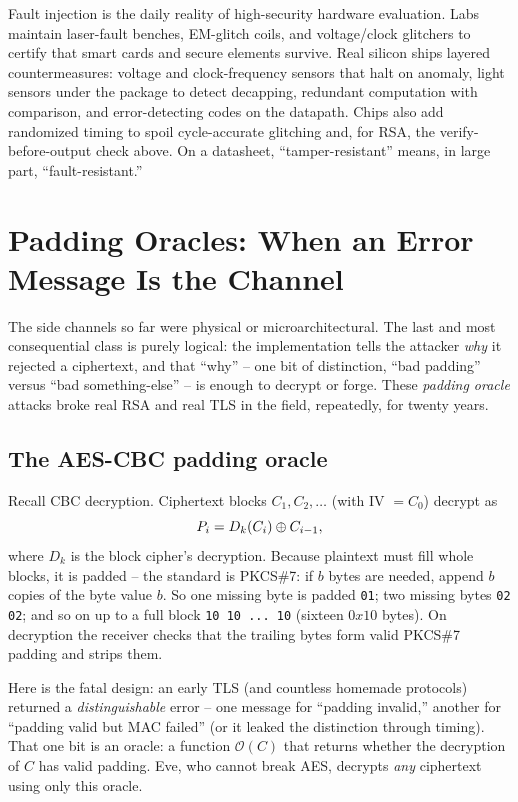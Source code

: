 \begin{applicationbox}
Fault injection is the daily reality of high-security hardware evaluation. Labs maintain laser-fault benches, EM-glitch coils, and voltage/clock glitchers to certify that smart cards and secure elements survive. Real silicon ships layered countermeasures: voltage and clock-frequency sensors that halt on anomaly, light sensors under the package to detect decapping, redundant computation with comparison, and error-detecting codes on the datapath. Chips also add randomized timing to spoil cycle-accurate glitching and, for RSA, the verify-before-output check above. On a datasheet, ``tamper-resistant'' means, in large part, ``fault-resistant.''
\end{applicationbox}

\section{Padding Oracles: When an Error Message Is the Channel}
\label{ch37:padding}

The side channels so far were physical or microarchitectural. The last and most consequential class is purely logical: the implementation tells the attacker \emph{why} it rejected a ciphertext, and that ``why'' -- one bit of distinction, ``bad padding'' versus ``bad something-else'' -- is enough to decrypt or forge. These \emph{padding oracle} attacks broke real RSA and real TLS in the field, repeatedly, for twenty years.

\subsection{The AES-CBC padding oracle}
\label{ch37:cbc-oracle}

Recall CBC decryption. Ciphertext blocks $C_1, C_2, \ldots$ (with IV $= C_0$) decrypt as
\[
P_i = D_k(C_i) \oplus C_{i-1},
\]
where $D_k$ is the block cipher's decryption. Because plaintext must fill whole blocks, it is padded -- the standard is PKCS\#7: if $b$ bytes are needed, append $b$ copies of the byte value $b$. So one missing byte is padded \texttt{01}; two missing bytes \texttt{02 02}; and so on up to a full block \texttt{10 10 ... 10} (sixteen $0x10$ bytes). On decryption the receiver checks that the trailing bytes form valid PKCS\#7 padding and strips them.

Here is the fatal design: an early TLS (and countless homemade protocols) returned a \emph{distinguishable} error -- one message for ``padding invalid,'' another for ``padding valid but MAC failed'' (or it leaked the distinction through timing). That one bit is an oracle: a function $\mathcal{O}(C)$ that returns whether the decryption of $C$ has valid padding. Eve, who cannot break AES, decrypts \emph{any} ciphertext using only this oracle.


